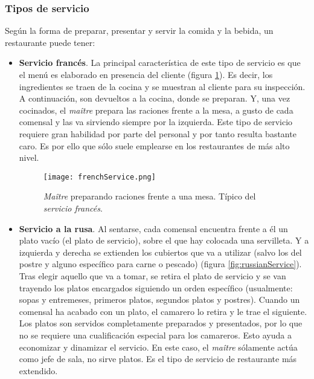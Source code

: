     \subsubsection{Tipos de servicio}
  Según la forma de preparar, presentar y servir la comida y la bebida, un
  restaurante puede tener:
  \begin{itemize}
  \item \textbf{Servicio francés}. La principal característica de este tipo de
  servicio es que el menú es elaborado en presencia del cliente (figura
  \ref{fig:frenchService}). Es decir, los ingredientes se traen de la cocina y
  se muestran al cliente para su inspección. A continuación, son devueltos a la
  cocina, donde se preparan. Y, una vez cocinados, el \emph{maître} prepara las
  raciones frente a la mesa, a gusto de cada comensal y las va sirviendo 
  siempre por la izquierda. Este tipo de servicio requiere gran habilidad por 
  parte del personal y por tanto resulta bastante caro. Es por ello que sólo 
  suele emplearse en los restaurantes de más alto nivel.

  \begin{figure}[!h]
    \begin{center}
      \texttt{[image: frenchService.png]}
      \caption{\emph{Maître} preparando raciones frente a una mesa. Típico del 
      \emph{servicio francés}.}
      \label{fig:frenchService}
    \end{center}
  \end{figure}

  \item \textbf{Servicio a la rusa}. Al sentarse, cada comensal encuentra 
  frente a él un plato vacío (el plato de servicio), sobre el que hay colocada 
  una servilleta. Y a izquierda y derecha se extienden los cubiertos que va a
  utilizar (salvo los del postre y alguno específico para carne o pescado)
  (figura \ref{fig:russianService}). Tras elegir aquello que va a tomar, se
  retira el plato de servicio y se van trayendo los platos encargados 
  siguiendo un orden específico (usualmente: sopas y entremeses, primeros 
  platos, segundos platos y postres). Cuando un comensal ha acabado con un 
  plato, el camarero lo retira y le trae el siguiente. Los platos son servidos 
  completamente preparados y presentados, por lo que no se requiere una 
  cualificación especial para los camareros. Esto ayuda a economizar y 
  dinamizar el servicio. En este caso, el \emph{maître} sólamente actúa como 
  jefe de sala, no sirve platos. Es el tipo de servicio de restaurante más 
  extendido.


\end{itemize}
